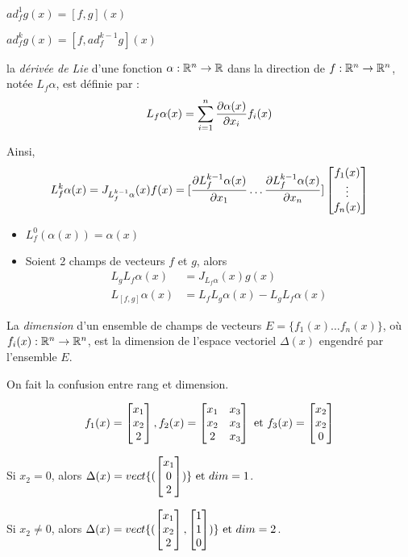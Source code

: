 \documentclass[main.tex]{subfiles}
\begin{document}
$ad_f^1 g(x) = [f,g](x)$

$ad_f^k g(x) = [f,ad_f^{k-1}g](x)$

\begin{defin}
la \emph{dérivée de Lie} d'une fonction $\alpha : \R^n \rightarrow \R$ dans la direction de $f : \R^n \rightarrow \R^n$, notée $L_f\alpha$, est définie par :
\[L_f \alpha(x) = \sum_{i=1}^n \derivp[\alpha(x)]{x_i}f_i(x) \]

Ainsi,
\[L_f^k \alpha (x) = J_{L_f^{k-1} \alpha} (x) f(x) = [ \derivp[L_f^{k-1} \alpha(x)]{x_1} \dots\derivp[L_f^{k-1} \alpha(x)]{x_n}] \vect{f_1(x) \\ \vdots \\ f_n(x) } \]
\end{defin}

\begin{rem}
\begin{itemize}
\item $L_f^0(\alpha(x)) = \alpha(x)$
\item Soient 2 champs de vecteurs $f$ et $g$, alors
\begin{align*}
L_g L_f \alpha (x) & = J_{L_f \alpha}(x) g(x) \\
L_{[f,g]} \alpha(x) & = L_f L_g \alpha(x) - L_gL_f \alpha(x)
\end{align*}
\end{itemize}
\end{rem}

\begin{defin}
La \emph{dimension} d'un ensemble de champs de vecteurs $E=\{f_1(x) \dots f_n(x)\}$, où $f_i(x) : \R^n \rightarrow \R^n$, est la dimension de l'espace vectoriel $\Delta(x)$ engendré par l'ensemble $E$.

\begin{rem}
On fait la confusion entre rang et dimension.
\end{rem}
\end{defin}

\begin{exemple}
\[ f_1(x) = \vect{x_1 \\ x_2 \\ 2}, f_2(x) =
  \begin{bmatrix}
x_1 & x_3 \\ x_2 & x_3 \\2 & x_3
\end{bmatrix}
\text{ et }f_3(x) = \vect{x_2 \\ x_2 \\ 0} \]

Si $x_2 = 0$, alors $\Delta(x) = vect\{( \vect{x_1 \\ 0 \\ 2} ) \} \text{ et }dim=1$.

Si $x_2 \neq 0$, alors $\Delta(x) = vect\{(\vect{x_1 \\ x_2 \\ 2},\vect{1 \\ 1 \\ 0})\} \text{ et }dim=2$.
\end{exemple}
\end{document}
